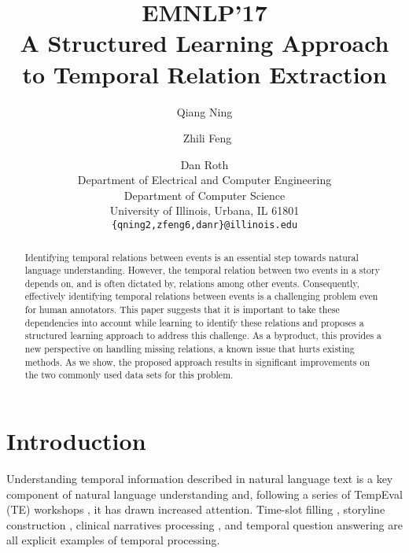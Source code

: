 \documentclass[11pt,letterpaper]{article}
\title{ \vspace*{-0.5in}
{{\small \hfill EMNLP'17}\\
\vspace*{.25in}} A Structured Learning Approach to Temporal Relation Extraction}
\author{Qiang Ning \and ~Zhili Feng  \and Dan Roth  \\
	Department of Electrical and Computer Engineering\\
	Department of Computer Science\\
	University of Illinois, Urbana, IL 61801\\
	{\tt \{qning2,zfeng6,danr\}@illinois.edu} \\}
\date{}
\newcommand{\ignore}[1]{}
\newcommand{\final}[1]{#1}
\begin{document}
	
	\maketitle
	
	\begin{abstract}
Identifying temporal relations between events is an essential step towards natural language understanding. However, the temporal relation between two events in a story depends on, and is often dictated by, relations among other events. Consequently, effectively identifying  temporal relations between events is a challenging problem even for human annotators. 
This paper suggests that it is important to take these dependencies into account while learning to identify these relations and proposes a structured learning approach to address this challenge. As a byproduct, this provides a new perspective on handling missing relations, a known issue that hurts existing methods. 
As we show, the proposed approach results in significant improvements on the two commonly used data sets for this problem. 
		
		\ignore{Identifying temporal relations between events is an essential step towards natural language understanding. However, the temporal relation between two events in a story cannot be determined in isolation. The relations among many other events should be taken into account, making the effective identification of temporal relations a challenging problem even for human annotators. 
This paper proposes a structured learning approach to address this challenge and a new perspective towards the vast majority of missing relations, the treatment of which is known to be a major issue that hurts existing methods. 
The proposed approach results in significant improvements on two evaluation sets, compared to the state-of-the-art on this problem. 
		}
	\end{abstract}
	\section{Introduction} \label{sec:intro}

\ignore{Can we describe the method under CCM?}

Understanding temporal information described in natural language text is a key component of natural language understanding \citep{mani2006machine, verhagen2007semeval, chambers2007classifying, bethard2007cu} \final{and, following} a series of TempEval (TE) workshops \citep{verhagen2007semeval,verhagen2010semeval,uzzaman2013TE3}, it has drawn \final{increased} attention.
Time-slot filling \citep{surdeanu2013overview,ji2014tackling}, storyline construction \citep{DoLuRo12,minard2015semeval}, clinical narratives processing \citep{JindalRo13d,bethard2016semeval}, and temporal question answering \citep{llorens2015semeval} are all explicit examples of temporal processing. 
	
\end{document}
